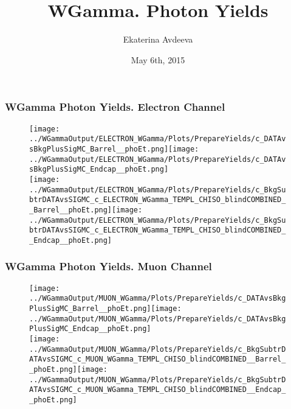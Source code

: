 \documentclass{beamer}
\title{WGamma. Photon Yields}
\author{Ekaterina Avdeeva}
\institute{University of Nebraska - Lincoln}
\date{May 6th, 2015}
\begin{document}

\begin{frame}\frametitle{WGamma Photon Yields. Electron Channel}
\begin{figure}
\texttt{[image: ../WGammaOutput/ELECTRON\_WGamma/Plots/PrepareYields/c\_DATAvsBkgPlusSigMC\_Barrel\_\_phoEt.png]}\texttt{[image: ../WGammaOutput/ELECTRON\_WGamma/Plots/PrepareYields/c\_DATAvsBkgPlusSigMC\_Endcap\_\_phoEt.png]}\\%
\texttt{[image: ../WGammaOutput/ELECTRON\_WGamma/Plots/PrepareYields/c\_BkgSubtrDATAvsSIGMC\_c\_ELECTRON\_WGamma\_TEMPL\_CHISO\_blindCOMBINED\_\_Barrel\_\_phoEt.png]}\texttt{[image: ../WGammaOutput/ELECTRON\_WGamma/Plots/PrepareYields/c\_BkgSubtrDATAvsSIGMC\_c\_ELECTRON\_WGamma\_TEMPL\_CHISO\_blindCOMBINED\_\_Endcap\_\_phoEt.png]}\\%
\end{figure}
\scriptsize
\end{frame}

\begin{frame}\frametitle{WGamma Photon Yields. Muon Channel}
\begin{figure}
\texttt{[image: ../WGammaOutput/MUON\_WGamma/Plots/PrepareYields/c\_DATAvsBkgPlusSigMC\_Barrel\_\_phoEt.png]}\texttt{[image: ../WGammaOutput/MUON\_WGamma/Plots/PrepareYields/c\_DATAvsBkgPlusSigMC\_Endcap\_\_phoEt.png]}\\%
\texttt{[image: ../WGammaOutput/MUON\_WGamma/Plots/PrepareYields/c\_BkgSubtrDATAvsSIGMC\_c\_MUON\_WGamma\_TEMPL\_CHISO\_blindCOMBINED\_\_Barrel\_\_phoEt.png]}\texttt{[image: ../WGammaOutput/MUON\_WGamma/Plots/PrepareYields/c\_BkgSubtrDATAvsSIGMC\_c\_MUON\_WGamma\_TEMPL\_CHISO\_blindCOMBINED\_\_Endcap\_\_phoEt.png]}\\%
\end{figure}
\scriptsize
\end{frame}
\end{document}

